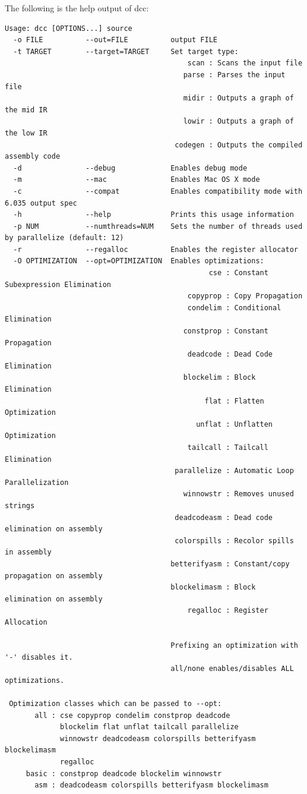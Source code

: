 \documentclass[11pt]{article}
\begin{document}
The following is the help output of dcc:
{\footnotesize
\begin{verbatim}
Usage: dcc [OPTIONS...] source
  -o FILE          --out=FILE          output FILE
  -t TARGET        --target=TARGET     Set target type:
										   scan : Scans the input file
										  parse : Parses the input file
										  midir : Outputs a graph of the mid IR
										  lowir : Outputs a graph of the low IR
										codegen : Outputs the compiled assembly code
  -d               --debug             Enables debug mode
  -m               --mac               Enables Mac OS X mode
  -c               --compat            Enables compatibility mode with 6.035 output spec
  -h               --help              Prints this usage information
  -p NUM           --numthreads=NUM    Sets the number of threads used by parallelize (default: 12)
  -r               --regalloc          Enables the register allocator
  -O OPTIMIZATION  --opt=OPTIMIZATION  Enables optimizations:
                                                cse : Constant Subexpression Elimination
                                           copyprop : Copy Propagation
                                           condelim : Conditional Elimination
                                          constprop : Constant Propagation
                                           deadcode : Dead Code Elimination
                                          blockelim : Block Elimination
                                               flat : Flatten Optimization
                                             unflat : Unflatten Optimization
                                           tailcall : Tailcall Elimination
                                        parallelize : Automatic Loop Parallelization
                                          winnowstr : Removes unused strings
                                        deadcodeasm : Dead code elimination on assembly
                                        colorspills : Recolor spills in assembly
                                       betterifyasm : Constant/copy propagation on assembly
                                       blockelimasm : Block elimination on assembly
                                           regalloc : Register Allocation
                                       
                                       Prefixing an optimization with '-' disables it.
                                       all/none enables/disables ALL optimizations.

 Optimization classes which can be passed to --opt:
       all : cse copyprop condelim constprop deadcode
             blockelim flat unflat tailcall parallelize
             winnowstr deadcodeasm colorspills betterifyasm blockelimasm
             regalloc
     basic : constprop deadcode blockelim winnowstr
       asm : deadcodeasm colorspills betterifyasm blockelimasm
\end{verbatim}}
\end{document}
